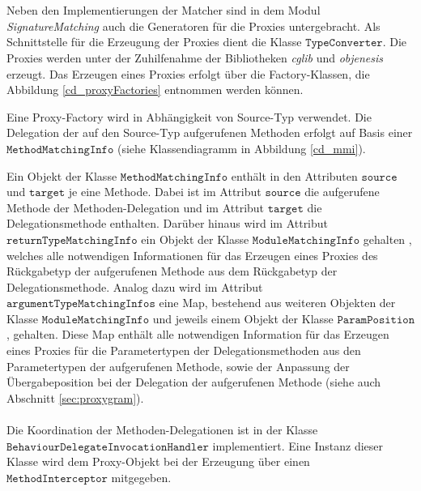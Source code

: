 \\\\
Neben den Implementierungen der Matcher sind in dem Modul \emph{SignatureMatching} auch die Generatoren für die Proxies untergebracht.  Als Schnittstelle für die Erzeugung der Proxies dient die Klasse $\texttt{TypeConverter}$. Die Proxies werden unter der Zuhilfenahme der Bibliotheken \emph{cglib} und \emph{objenesis} erzeugt. Das Erzeugen eines Proxies erfolgt über die Factory-Klassen, die Abbildung \ref{cd_proxyFactories} entnommen werden können.
\begin{figure}

\end{figure}\label{cd_proxyFactories}
Eine Proxy-Factory wird in Abhängigkeit von Source-Typ verwendet. Die Delegation der auf den Source-Typ aufgerufenen Methoden erfolgt auf Basis einer $\texttt{MethodMatchingInfo}$ (siehe Klassendiagramm in Abbildung \ref{cd_mmi}).
\begin{figure}
\end{figure}\label{cd_mmi}
\noindent
Ein Objekt der Klasse $\texttt{MethodMatchingInfo}$ enthält in den Attributen $\texttt{source}$ und $\texttt{target}$ je eine Methode. Dabei ist im Attribut $\texttt{source}$ die aufgerufene Methode der Methoden-Delegation und im Attribut $\texttt{target}$ die Delegationsmethode enthalten. Darüber hinaus wird im Attribut $\texttt{returnTypeMatchingInfo}$ ein Objekt der Klasse $\texttt{ModuleMatchingInfo}$ gehalten , welches alle notwendigen Informationen für das Erzeugen eines Proxies des Rückgabetyp der aufgerufenen Methode aus dem Rückgabetyp der Delegationsmethode. Analog dazu wird im Attribut $\texttt{argumentTypeMatchingInfos}$ eine Map, bestehend aus weiteren Objekten der Klasse $\texttt{ModuleMatchingInfo}$ und jeweils einem Objekt der Klasse $\texttt{ParamPosition}$, gehalten. Diese Map enthält alle notwendigen Information für das Erzeugen eines Proxies für die Parametertypen der Delegationsmethoden aus den Parametertypen der aufgerufenen Methode, sowie der Anpassung der Übergabeposition bei der Delegation der aufgerufenen Methode (siehe auch Abschnitt \ref{sec:proxygram}).
\\\\
Die Koordination der Methoden-Delegationen ist in der Klasse $\texttt{BehaviourDelegateInvocationHandler}$ implementiert. Eine Instanz dieser Klasse wird dem Proxy-Objekt bei der Erzeugung über einen $\texttt{MethodInterceptor}$ mitgegeben.

